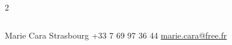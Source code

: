 \documentclass[lighthipster]{simplehipstercv}
\newlength{\rightcolwidth}
\begin{document}
\begin{paracol}{2}
\begin{minipage}[t]{0.45\textwidth}
\begin{tabular}{l | ll}
\end{tabular}

\bigskip

\end{minipage}


\setlength{\parindent}{0pt}

\begin{minipage}[t]{\rightcolwidth}

\begin{center}
\fontfamily{\sfdefault}\selectfont
\color{black!70}

{\small
Marie Cara
 Strasbourg
 +33 7 69 97 36 44
 \protect\url{marie.cara@free.fr}
}

\end{center}

\end{minipage}

\end{paracol}
\end{document}
